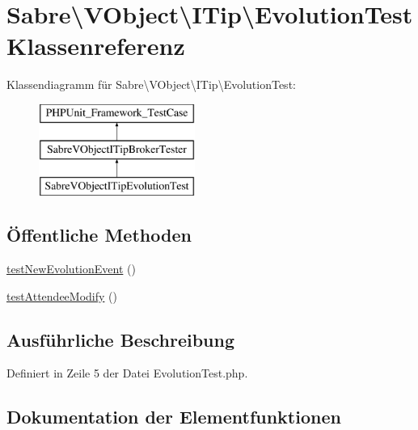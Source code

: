 \hypertarget{class_sabre_1_1_v_object_1_1_i_tip_1_1_evolution_test}{}\section{Sabre\textbackslash{}V\+Object\textbackslash{}I\+Tip\textbackslash{}Evolution\+Test Klassenreferenz}
\label{class_sabre_1_1_v_object_1_1_i_tip_1_1_evolution_test}
Klassendiagramm für Sabre\textbackslash{}V\+Object\textbackslash{}I\+Tip\textbackslash{}Evolution\+Test\+:\begin{figure}[H]
\begin{center}
\leavevmode
\includegraphics[height=3.000000cm]{class_sabre_1_1_v_object_1_1_i_tip_1_1_evolution_test}
\end{center}
\end{figure}
\subsection*{Öffentliche Methoden}
\begin{DoxyCompactItemize}
\item 
\mbox{\hyperlink{class_sabre_1_1_v_object_1_1_i_tip_1_1_evolution_test_adfd5d39a116bdc8c16b4d62e28d443e4}{test\+New\+Evolution\+Event}} ()
\item 
\mbox{\hyperlink{class_sabre_1_1_v_object_1_1_i_tip_1_1_evolution_test_a158045b7ffc90663291fb16e2e7a9390}{test\+Attendee\+Modify}} ()
\end{DoxyCompactItemize}


\subsection{Ausführliche Beschreibung}


Definiert in Zeile 5 der Datei Evolution\+Test.\+php.



\subsection{Dokumentation der Elementfunktionen}
\mbox{\label{class_sabre_1_1_v_object_1_1_i_tip_1_1_evolution_test_a158045b7ffc90663291fb16e2e7a9390}} 
